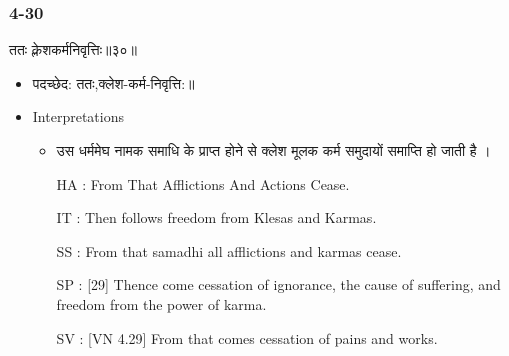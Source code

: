 \begin{frame}[fragile]\frametitle{4-30}
\begin{sanskrit}
ततः क्लेशकर्मनिवृत्तिः॥३०॥
\end{sanskrit}

	\begin{itemize}
	\item पदच्छेद:  ततः,क्लेश-कर्म-निवृत्ति:‌॥
	\item Interpretations
		\begin{itemize}	
		\item  उस धर्ममेघ नामक समाधि के प्राप्त होने से क्लेश मूलक कर्म समुदायों समाप्ति हो जाती है ।
		\item [HA]: From That Afflictions And Actions Cease.
		\item [IT]: Then follows freedom from Klesas and Karmas.
		\item [SS]: From that samadhi all afflictions and karmas cease.
		\item [SP]: [29] Thence come cessation of ignorance, the cause of suffering, and freedom from the power of karma.
		\item [SV]: [VN 4.29] From that comes cessation of pains and works. 
		\end{itemize}
	\end{itemize}
\end{frame}


